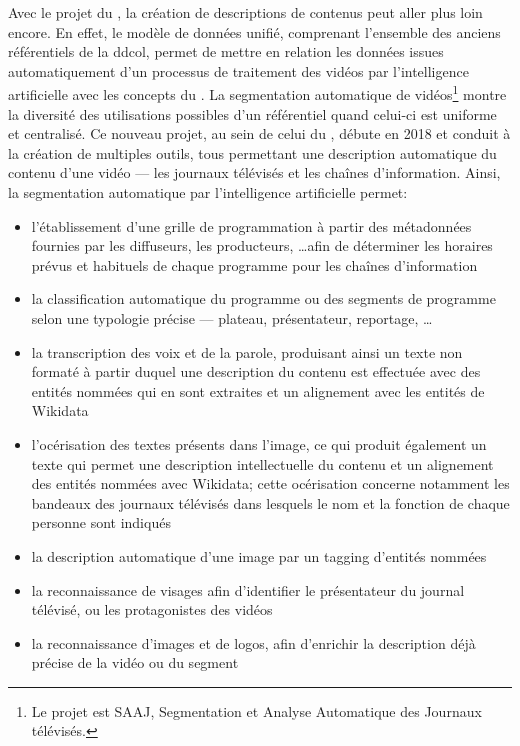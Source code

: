 Avec le projet du \ldd, la création de descriptions de contenus peut aller plus loin encore. En effet, le modèle de données unifié, comprenant l'ensemble des anciens référentiels de la \ac{ddcol}, permet de mettre en relation les données issues automatiquement d'un processus de traitement des vidéos par l'intelligence artificielle avec les concepts du \ldd. La segmentation automatique de vidéos\footnote{Le projet est SAAJ, Segmentation et Analyse Automatique des Journaux télévisés.} montre la diversité des utilisations possibles d'un référentiel quand celui-ci est uniforme et centralisé. Ce nouveau projet, au sein de celui du \ldd, débute en 2018 et conduit à la création de multiples outils, tous permettant une description automatique du contenu d'une vidéo --- les journaux télévisés et les chaînes d'information. Ainsi, la segmentation automatique par l'intelligence artificielle permet:
\begin{itemize}
	\item l'établissement d'une grille de programmation à partir des métadonnées fournies par les diffuseurs, les producteurs, \dots afin de déterminer les horaires prévus et habituels de chaque programme pour les chaînes d'information
	\item la classification automatique du programme ou des segments de programme selon une typologie précise --- plateau, présentateur, reportage, \dots
	\item la transcription des voix et de la parole, produisant ainsi un texte non formaté à partir duquel une description du contenu est effectuée avec des entités nommées qui en sont extraites et un alignement avec les entités de Wikidata
	\item l'océrisation des textes présents dans l'image, ce qui produit également un texte qui permet une description intellectuelle du contenu et un alignement des entités nommées avec Wikidata; cette océrisation concerne notamment les bandeaux des journaux télévisés dans lesquels le nom et la fonction de chaque personne sont indiqués
	\item la description automatique d'une image par un tagging d'entités nommées
	\item la reconnaissance de visages afin d'identifier le présentateur du journal télévisé, ou les protagonistes des vidéos
	\item la reconnaissance d'images et de logos, afin d'enrichir la description déjà précise de la vidéo ou du segment
\end{itemize} 

